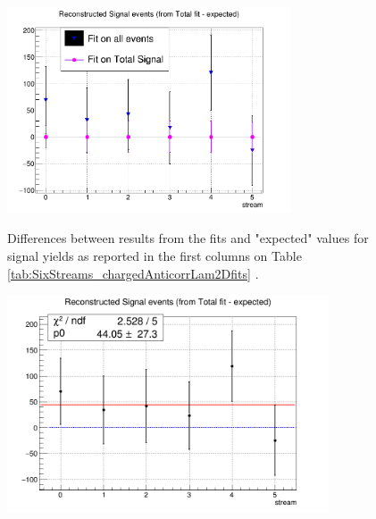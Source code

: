 \begin{figure}[H]
\centering
{\includegraphics[width=0.75\textwidth]{06-chargedAnticorrBtoLambda/figs/Fitted_RecoSignal_chargedAntiCorrLambdaC.png}}
\caption{Differences between results from the fits and "expected" values for signal yields as reported in the first columns on Table \ref{tab:SixStreams_chargedAnticorrLam2Dfits} .}
\label{fig:chargedAnticorrRecoSignal_fit-expectedPlot}
\end{figure}

\begin{figure}[H]
\centering
{\includegraphics[width=0.85\textwidth]{06-chargedAnticorrBtoLambda/figs/RecoSignal_streams_fittedPoints_chargedAnticorrLambdaC_w_CrossfeedRatio_param.png}}
\caption{}
\label{fig:RecoSignal_streams_fittedPoints_charged_anticorrLambdaC}
\end{figure}

